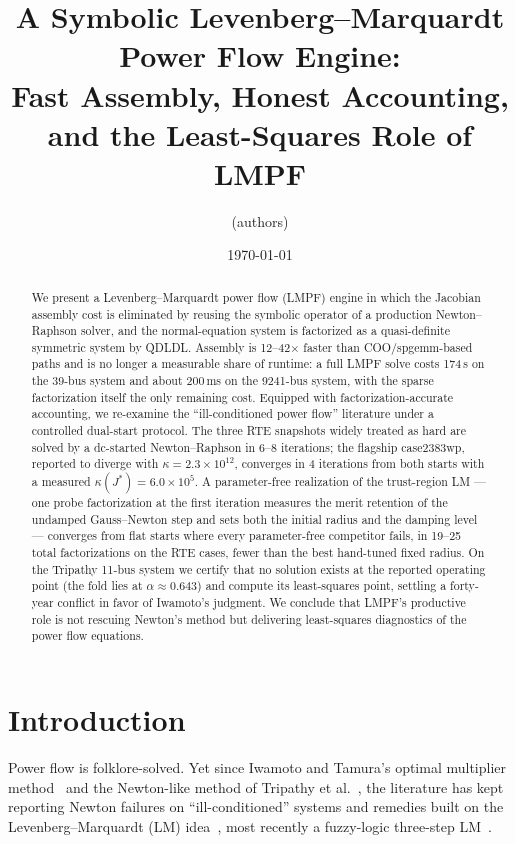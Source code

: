\documentclass[11pt]{article}
\title{A Symbolic Levenberg--Marquardt Power Flow Engine:\\
Fast Assembly, Honest Accounting, and the Least-Squares Role of LMPF}
\author{(authors)}
\date{\today}
\begin{document}
\maketitle

\begin{abstract}
We present a Levenberg--Marquardt power flow (LMPF) engine in which the
Jacobian assembly cost is eliminated by reusing the symbolic operator of a
production Newton--Raphson solver, and the normal-equation system is
factorized as a quasi-definite symmetric system by QDLDL. Assembly is
12--42$\times$ faster than COO/spgemm-based paths and is no longer a
measurable share of runtime: a full LMPF solve costs 174\,\textmu s on the
39-bus system and about 200\,ms on the 9241-bus system, with the sparse
factorization itself the only remaining cost.
Equipped with factorization-accurate accounting, we re-examine the
``ill-conditioned power flow'' literature under a controlled dual-start
protocol. The three RTE snapshots widely treated as hard are solved by a
dc-started Newton--Raphson in 6--8 iterations; the flagship case2383wp,
reported to diverge with $\kappa = 2.3\times10^{12}$, converges in 4
iterations from both starts with a measured $\kappa(J^*) = 6.0\times10^{5}$.
A parameter-free realization of the trust-region LM --- one probe
factorization at the first iteration measures the merit retention of the
undamped Gauss--Newton step and sets both the initial radius and the damping
level --- converges from flat starts where every parameter-free competitor
fails, in 19--25 total factorizations on the RTE cases, fewer than the best
hand-tuned fixed radius. On the Tripathy 11-bus system we certify that no
solution exists at the reported operating point (the fold lies at
$\alpha \approx 0.643$) and compute its least-squares point, settling a
forty-year conflict in favor of Iwamoto's judgment. We conclude that LMPF's
productive role is not rescuing Newton's method but delivering least-squares
diagnostics of the power flow equations.
\end{abstract}

\section{Introduction}

Power flow is folklore-solved. Yet since Iwamoto and Tamura's optimal
multiplier method~\cite{iwamoto1981} and the Newton-like method of Tripathy
et al.~\cite{tripathy1982}, the literature has kept reporting Newton
failures on ``ill-conditioned'' systems and remedies built on the
Levenberg--Marquardt (LM) idea~\cite{levenberg1944,marquardt1963}, most
recently a fuzzy-logic three-step LM~\cite{derakhshandeh2018}.
\end{document}
